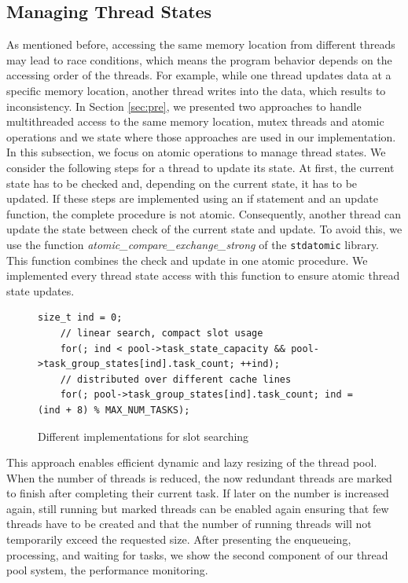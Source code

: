 \documentclass[conference]{IEEEtran}
\begin{document}
\subsection{Managing Thread States}
As mentioned before, accessing the same memory location from different threads may lead to race conditions, which means the program behavior depends on the accessing order of the threads. For example, while one thread updates data at a specific memory location, another thread writes into the data, which results to inconsistency. In Section \ref{sec:pre}, we presented two approaches to handle multithreaded access to the same memory location, mutex threads and atomic operations and we state where those approaches are used in our implementation. In this subsection, we focus on atomic operations to manage thread states. We consider the following steps for a thread to update its state. At first, the current state has to be checked and, depending on the current state, it has to be updated. If these steps are implemented using an if statement and an update function, the complete procedure is not atomic. Consequently, another thread can update the state between check of the current state and update. To avoid this, we use the function \emph{atomic\_compare\_exchange\_strong} \cite{atomicstrong} of the \texttt{stdatomic} library. This function combines the check and update in one atomic procedure. We implemented every thread state access with this function to ensure atomic thread state updates. 

\begin{figure}
	\begin{lstlisting}[style=CStyle,numbers=none]
	size_t ind = 0;
	// linear search, compact slot usage
	for(; ind < pool->task_state_capacity && pool->task_group_states[ind].task_count; ++ind);
	// distributed over different cache lines
	for(; pool->task_group_states[ind].task_count; ind = (ind + 8) % MAX_NUM_TASKS);
	\end{lstlisting}
	\caption{Different implementations for slot searching}
	\label{fig10}
\end{figure}

This approach enables efficient dynamic and lazy resizing of the thread pool. When the number of threads is reduced, the now redundant threads are marked to finish after completing their current task. If later on the number is increased again, still running but marked threads can be enabled again ensuring that few threads have to be created and that the number of running threads will not temporarily exceed the requested size. 
 After presenting the enqueueing, processing, and waiting for tasks, we show the second component of our thread pool system, the performance monitoring.
\end{document}
